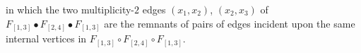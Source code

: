 \documentclass[12pt]{amsart}
\theoremstyle{definition}
\numberwithin{equation}{section}
\begin{document}
in which the two multiplicity-$2$ edges $(x_1,x_2)$,
$(x_2,x_3)$ of 
$F_{[1,3]}\bullet F_{[2,4]} \bullet F_{[1,3]}$
are the remnants of pairs of edges incident upon the same 
internal vertices in $F_{[1,3]} \circ F_{[2,4]} \circ F_{[1,3]}$.
\end{document}
